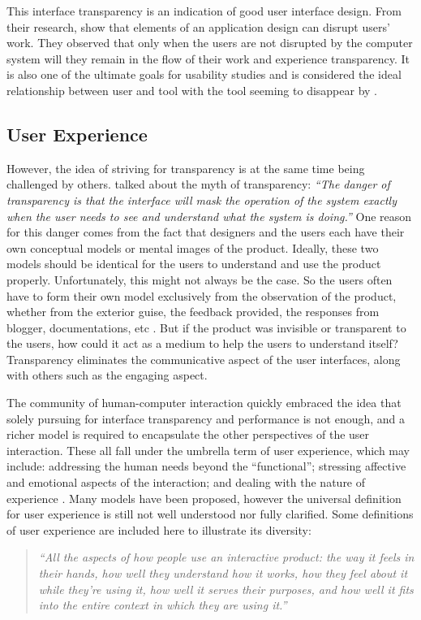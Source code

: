 \documentclass[a4paper,titlepage]{article}
\begin{document}
This interface transparency is an indication of good user interface
design. From their research, \citet{transparency:holtzblatt} show that
elements of an application design can disrupt users' work. They
observed that only when the users are not disrupted by the computer
system will they remain in the flow of their work and experience
transparency. It is also one of the ultimate goals for usability
studies and is considered the ideal relationship between user and tool
with the tool seeming to disappear by \citet{transparency:rutkoski}.

\subsection{User Experience}
However, the idea of striving for transparency is at the same time
being challenged by others. \citet[p.~55]{windows:bolter} talked about
the myth of transparency: {\it ``The danger of transparency is that
  the interface will mask the operation of the system exactly when the
  user needs to see and understand what the system is doing.''} One
reason for this danger comes from the fact that designers and the
users each have their own conceptual models or mental images of the
product. Ideally, these two models should be identical for the users
to understand and use the product properly. Unfortunately, this might
not always be the case. So the users often have to form their own
model exclusively from the observation of the product, whether from
the exterior guise, the feedback provided, the responses from blogger,
documentations, etc \citet{design:norman}. But if the product was
invisible or transparent to the users, how could it act as a medium to
help the users to understand itself? Transparency eliminates the
communicative aspect of the user interfaces, along with others such as
the engaging aspect.

The community of human-computer interaction quickly embraced the idea
that solely pursuing for interface transparency and performance is not
enough, and a richer model is required to encapsulate the other
perspectives of the user interaction. These all fall under the
umbrella term of user experience, which may include: addressing the
human needs beyond the ``functional''; stressing affective and
emotional aspects of the interaction; and dealing with the nature of
experience \citep{ux:hassenzahl}. Many models have been proposed,
however the universal definition for user experience is still not well
understood nor fully clarified. Some definitions of user experience
are included here to illustrate its diversity:
\begin{quote}
  {\it ``All the aspects of how people use an interactive product: the
    way it feels in their hands, how well they understand how it
    works, how they feel about it while they're using it, how well it
    serves their purposes, and how well it fits into the entire
    context in which they are using it.''}

  \raggedleft \citet{experience:alben}
\end{quote}
\end{document}

